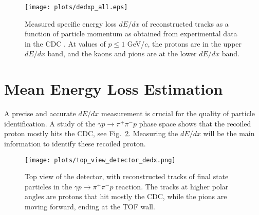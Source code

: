 \begin{figure}[H]
    \centering
    \texttt{[image: plots/dedxp\_all.eps]}
    \caption{\label{fig.3.1}Measured specific energy loss $dE/dx$ of reconstructed tracks as a function of particle momentum as obtained from experimental data in the CDC . At values of $p \leq 1$ GeV/$c$, the protons are in the upper $dE/dx$ band, and the kaons and pions are at the lower $dE/dx$ band.}
\end{figure}

\section{Mean Energy Loss Estimation}
\label{p.3.2}

A precise and accurate $dE/dx$ measurement is crucial for the quality of particle identification. A study of the $\gamma p \rightarrow \pi^{+} \pi^{-} p$ phase space shows that the recoiled proton mostly hits the CDC, see Fig.~\ref{fig.3.2}.
Measuring the $dE/dx$ will be the main information to identify these recoiled proton.

\begin{figure}[H]
    \centering
    \texttt{[image: plots/top\_view\_detector\_dedx.png]}
    \caption{\label{fig.3.2}Top view of the detector, with reconstructed tracks of final state particles in the $\gamma p \rightarrow \pi^{+} \pi^{-} p$ reaction. The tracks at higher polar angles are protons that hit mostly the CDC, while the pions are moving forward, ending at the TOF wall.}
\end{figure}


